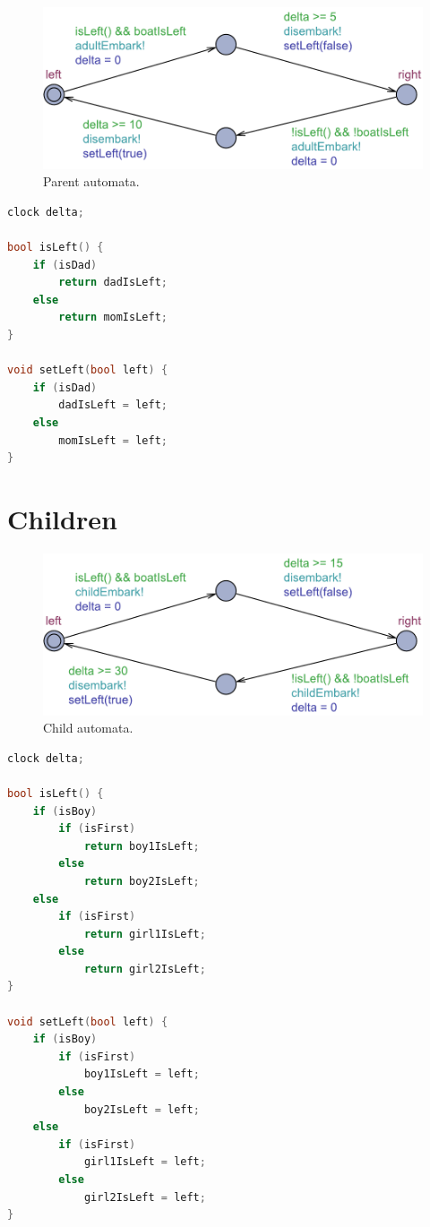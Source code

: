 \documentclass[a4paper,12pt]{scrartcl}
\begin{document}
\begin{figure}[h!]
\centering
\includegraphics[width=0.7\linewidth]{Parent.pdf}
\caption{Parent automata.}
\label{fig:parent}
\end{figure}

\begin{lstlisting}[language=CPP, label = lst:plugin_example, caption = Parent declaration.]
clock delta;

bool isLeft() {
    if (isDad)
        return dadIsLeft;
    else
        return momIsLeft;
}

void setLeft(bool left) {
    if (isDad)
        dadIsLeft = left;
    else
        momIsLeft = left;
}
\end{lstlisting}



\section*{Children}

\begin{figure}[h!]
\centering
\includegraphics[width=0.7\linewidth]{Child.pdf}
\caption{Child automata.}
\label{fig:child}
\end{figure}

\begin{lstlisting}[language=CPP, label = lst:plugin_example, caption = Child declaration.]
clock delta;

bool isLeft() {
    if (isBoy)
        if (isFirst)
            return boy1IsLeft;
        else
            return boy2IsLeft;
    else
        if (isFirst)
            return girl1IsLeft;
        else
            return girl2IsLeft;
}

void setLeft(bool left) {
    if (isBoy)
        if (isFirst)
            boy1IsLeft = left;
        else
            boy2IsLeft = left;
    else
        if (isFirst)
            girl1IsLeft = left;
        else
            girl2IsLeft = left;
}
\end{lstlisting}
\end{document}
